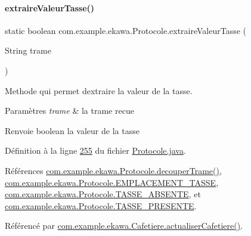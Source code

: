 \paragraph{\texorpdfstring{extraire\+Valeur\+Tasse()}{extraireValeurTasse()}}
{\footnotesize\ttfamily static boolean com.\+example.\+ekawa.\+Protocole.\+extraire\+Valeur\+Tasse (\begin{DoxyParamCaption}\item[{String}]{trame }\end{DoxyParamCaption})\hspace{0.3cm}{\ttfamily [static]}}



Methode qui permet d\textquotesingle{}extraire la valeur de la tasse. 


\begin{DoxyParams}{Paramètres}
{\em trame} & la trame recue \\
\hline
\end{DoxyParams}
\begin{DoxyReturn}{Renvoie}
boolean la valeur de la tasse 
\end{DoxyReturn}


Définition à la ligne \hyperlink{_protocole_8java_source_l00255}{255} du fichier \hyperlink{_protocole_8java_source}{Protocole.\+java}.



Références \hyperlink{_protocole_8java_source_l00208}{com.\+example.\+ekawa.\+Protocole.\+decouper\+Trame()}, \hyperlink{_protocole_8java_source_l00045}{com.\+example.\+ekawa.\+Protocole.\+E\+M\+P\+L\+A\+C\+E\+M\+E\+N\+T\+\_\+\+T\+A\+S\+SE}, \hyperlink{_protocole_8java_source_l00046}{com.\+example.\+ekawa.\+Protocole.\+T\+A\+S\+S\+E\+\_\+\+A\+B\+S\+E\+N\+TE}, et \hyperlink{_protocole_8java_source_l00047}{com.\+example.\+ekawa.\+Protocole.\+T\+A\+S\+S\+E\+\_\+\+P\+R\+E\+S\+E\+N\+TE}.



Référencé par \hyperlink{_cafetiere_8java_source_l00543}{com.\+example.\+ekawa.\+Cafetiere.\+actualiser\+Cafetiere()}.


